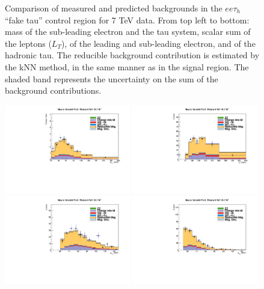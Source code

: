 \begin{figure}
\begin{center}
  \caption{Comparison of measured and predicted backgrounds in the $ee\tau_h$ ``fake tau'' control region for 7 TeV data.
  From top left to bottom: mass of the sub-leading electron and the tau system, scalar sum of the leptons \pT ($L_T$), \pT of the leading and sub-leading electron, and \pT of the hadronic tau.
  The reducible background contribution is estimated by the kNN method, in the same manner as in the signal region.
  The shaded band represents the uncertainty on the sum of the background contributions.
  }
  \label{fig:LLT_eet_f3_control_7TeV}
\end{center}
\end{figure}

\begin{figure}
\begin{center}
  \includegraphics[width=0.49\textwidth]{4_Analisys/pics/8TeV/plots/eet/f3/Full/final-f3-subMass-Full.pdf}
  \includegraphics[width=0.49\textwidth]{4_Analisys/pics/8TeV/plots/eet/f3/final-f3-LT.pdf}\\
  \includegraphics[width=0.49\textwidth]{4_Analisys/pics/8TeV/plots/eet/f3/Full/final-f3-e1Pt-Full.pdf}
  \includegraphics[width=0.49\textwidth]{4_Analisys/pics/8TeV/plots/eet/f3/Full/final-f3-e2Pt-Full.pdf}\\

\end{center}
\end{figure}

